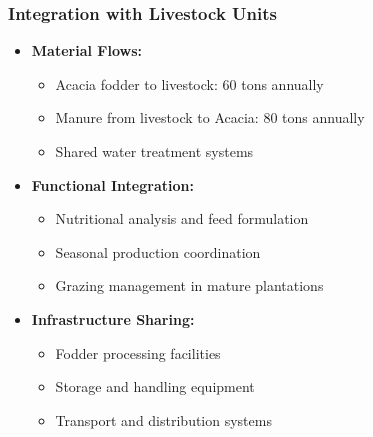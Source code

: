 \subsubsection{Integration with Livestock Units}
\begin{itemize}
    \item \textbf{Material Flows:}
    \begin{itemize}
        \item Acacia fodder to livestock: 60 tons annually
        \item Manure from livestock to Acacia: 80 tons annually
        \item Shared water treatment systems
    \end{itemize}
    \item \textbf{Functional Integration:}
    \begin{itemize}
        \item Nutritional analysis and feed formulation
        \item Seasonal production coordination
        \item Grazing management in mature plantations
    \end{itemize}
    \item \textbf{Infrastructure Sharing:}
    \begin{itemize}
        \item Fodder processing facilities
        \item Storage and handling equipment
        \item Transport and distribution systems
    \end{itemize}
\end{itemize}

